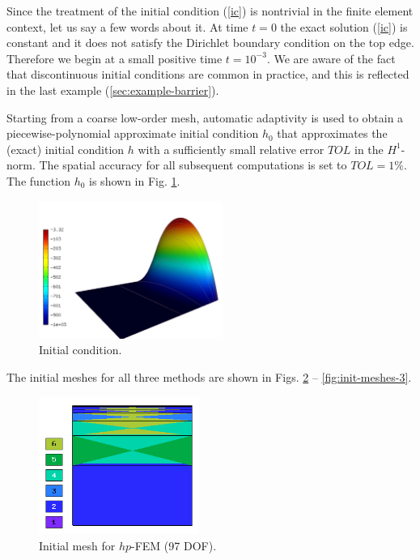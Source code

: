 \documentclass[final,3p,times,twocolumn]{elsarticle}
\begin{document}
Since the treatment of the initial condition (\ref{ic}) is nontrivial
in the finite element context, let us say a few words about it. 
At time $t = 0$ the exact solution (\ref{ic}) is constant and it 
does not satisfy the Dirichlet boundary condition on the top edge. 
Therefore we begin at a small positive time $t = 10^{-3}$.
We are aware of the fact that discontinuous initial conditions are common
in practice, and this is reflected in the last example (\ref{sec:example-barrier}).

Starting from a coarse low-order mesh, automatic adaptivity is used
to obtain a piecewise-polynomial approximate initial condition 
$h_0$ that approximates the (exact) initial condition $h$ with 
a sufficiently small relative error $TOL$ in the $H^1$-norm. The 
spatial accuracy for all subsequent computations is set to $TOL = 1\%$.
The function $h_0$ is shown in Fig. \ref{fig:init-cond}.

\begin{figure}[!ht]
\begin{center}
\includegraphics[height=4.5cm]{init-tracy.png}
\end{center}
\vspace{-6mm}
\caption{Initial condition.}
\label{fig:init-cond}
\end{figure}
\vspace{4mm}
\noindent
The initial meshes for all three methods are shown in 
Figs. \ref{fig:init-meshes-1} -- \ref{fig:init-meshes-3}.

\begin{figure}[!ht]
\begin{center}
\includegraphics[height=4.5cm]{mesh_init_hp.png}
\end{center}
\vspace{-6mm}
\caption{Initial mesh for $hp$-FEM (97 DOF).}
\label{fig:init-meshes-1}
\end{figure}
\end{document}
